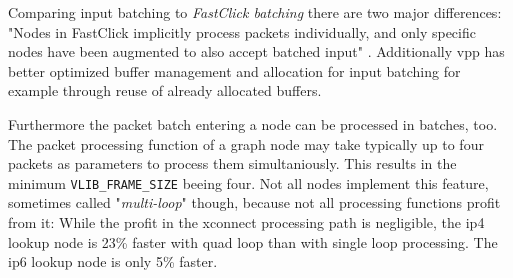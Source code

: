Comparing input batching to \textit{FastClick batching} there are two major
differences: "Nodes in FastClick implicitly process packets
individually, and only specific nodes have been augmented to also
accept batched input" \cite{linguaglossa2017high}. Additionally
\Ac{vpp} has better optimized buffer management and allocation for
input batching for example through reuse of already allocated buffers.
\cite{linguaglossa2017high}

Furthermore the packet batch entering a node can be processed in
batches, too. The packet processing function of a graph node may take
typically up to four packets as parameters to process them
simultaniously. This results in the minimum
\lstinline|VLIB_FRAME_SIZE| beeing four. Not all nodes implement this
feature, sometimes called "\textit{multi-loop}" though, because not
all processing functions profit from it: While the profit in the
xconnect processing path is negligible, the \Ac{ip4} lookup node is
23\% faster with quad loop than with single loop processing. The
\Ac{ip6} lookup node is only 5\% faster.



